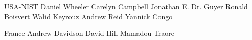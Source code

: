 USA-NIST
Daniel Wheeler
Carelyn Campbell
Jonathan E. Dr. Guyer
Ronald Boisvert
Walid Keyrouz
Andrew Reid
Yannick Congo

France
Andrew Davidson
David Hill
Mamadou Traore